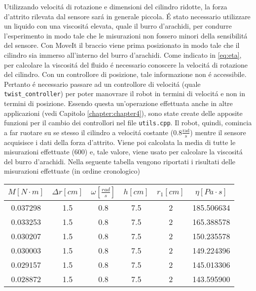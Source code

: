 Utilizzando velocit\'{a} di rotazione e dimensioni del cilindro ridotte, la forza d'attrito rilevata dal sensore sar\'{a} in generale 
piccola. \'{E} stato necessario utilizzare un liquido con una viscosit\'{a} elevata, quale il burro d'arachidi, per condurre l'esperimento in modo tale 
che le misurazioni non fossero minori della sensibilit\'{a} del sensore. 
Con MoveIt il braccio viene prima posizionato in modo tale che il cilindro sia immerso all'interno del burro d'arachidi. 
Come indicato in \ref{eq:eta}, per calcolare la viscosit\'{a} del fluido \'{e} necessario conoscere 
la velocit\'{a} di rotazione del cilindro. Con un controllore di posizione, tale informazione non \'{e} accessibile. 
Pertanto \'{e} necessario passare ad un controllore di velocit\'{a} (quale \verb|twist_controller|) per poter manovrare il robot in 
termini di velocit\'{a} e non in termini di posizione. Essendo questa un'operazione effettuata anche in altre applicazioni (vedi  
Capitolo \ref{chapter:chapter4}), sono state create delle apposite funzioni per il cambio dei controllori nel file \verb|utils.cpp|. 
Il robot, quindi, comincia a far ruotare su se stesso il cilindro a velocit\'{a} costante ($0.8 \frac{\text{rad}}{\text{s}}$) mentre 
il sensore acquisisce i dati della forza d'attrito. 
Viene poi calcolata la media di tutte le misurazioni effettuate (600) e, tale valore, viene usato per calcolare la viscosit\'{a} 
del burro d'arachidi. 
Nella seguente tabella vengono riportati i risultati delle misurazioni effettuate (in ordine cronologico)
\begin{center}
    \begin{tabular}{ ||c|c|c|c|c|c|| } 
     \hline
     $M \left[N \cdot m\right]$ & $\Delta r \left[cm\right]$ & $\omega \left[\frac{rad}{s}\right]$ & $h \left[cm\right]$ & $r_{1} \left[cm\right]$ & $\eta \left[Pa \cdot s\right]$\\
     \hline\hline 
     0.037298 & 1.5 & 0.8 & 7.5 & 2 & 185.506634 \\ 
     0.033253 & 1.5 & 0.8 & 7.5 & 2 & 165.388578 \\ 
     0.030207 & 1.5 & 0.8 & 7.5 & 2 & 150.235578 \\ 
     0.030003 & 1.5 & 0.8 & 7.5 & 2 & 149.224396 \\ 
     0.029157 & 1.5 & 0.8 & 7.5 & 2 & 145.013306 \\ 
     0.028872 & 1.5 & 0.8 & 7.5 & 2 & 143.595900 \\ 
     \hline
    \end{tabular}
\end{center}
